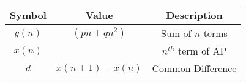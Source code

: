 \begin{tabular}{|c|c|c|}
    \hline
      \textbf{Symbol}   &  \textbf{Value} & \textbf{Description}\\
    \hline
       $y(n)$  & $(pn + qn^2)$ & Sum of $n$ terms\\
    \hline
        $x(n)$ &  & $n^{th}$ term of AP\\
    \hline
        $d$ & $x(n+1) - x(n)$ &Common Difference\\
    \hline 
\end{tabular}
